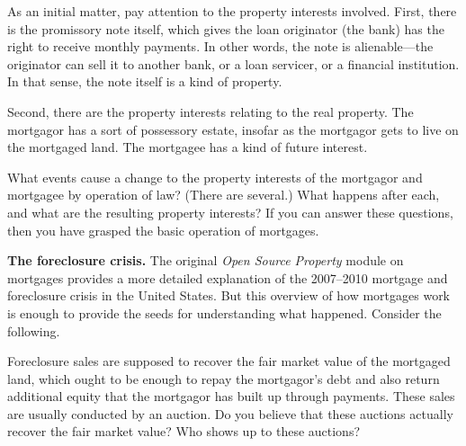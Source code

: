 
\item \label{mortgage-interests} As an initial matter, pay attention to the
property interests involved.
First, there is the promissory note itself, which gives the loan originator (the
bank) has the right to receive monthly payments.
In other words, the note is alienable---the originator can sell it to another
bank, or a loan servicer, or a financial institution. In that sense, the note
itself is a kind of property.


Second, there are the property interests relating to the real property.
The mortgagor has a sort of possessory estate, insofar as the mortgagor gets to
live on the mortgaged land. The mortgagee has a kind of future interest.

What events cause a change to the
property interests of the mortgagor and mortgagee by operation of law? (There
are several.) What happens after each, and what are the resulting property
interests? If you can answer these questions, then you have grasped the basic
operation of mortgages.

\item \textbf{The foreclosure crisis.} The original \emph{Open Source Property}
module on mortgages provides a
more detailed explanation of the 2007--2010 mortgage and foreclosure crisis in
the United States. But this overview of how mortgages work is enough to provide
the seeds for understanding what happened. Consider the following.

\item Foreclosure sales are supposed to recover the fair market value of the
mortgaged land, which ought to be enough to repay the mortgagor's debt and also
return additional equity that the mortgagor has built up through payments. These
sales are usually conducted by an auction. Do you believe that these auctions
actually recover the fair market value? Who shows up to these auctions?

